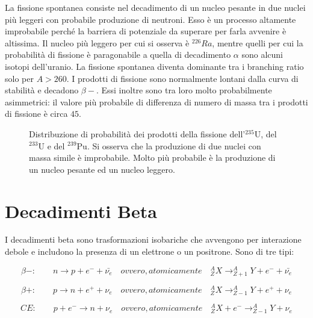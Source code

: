 La fissione spontanea consiste nel decadimento di un nucleo pesante in due nuclei più leggeri con probabile produzione di neutroni. Esso è un processo altamente improbabile perché la barriera di potenziale da superare per farla avvenire è altissima. Il nucleo più leggero per cui si osserva è $^{226}Ra$, mentre quelli per cui la probabilità di fissione è paragonabile a quella di decadimento $\alpha$ sono alcuni isotopi dell'uranio. La fissione spontanea diventa dominante tra i branching ratio solo per $A>260$.
I prodotti di fissione sono normalmente lontani dalla curva di stabilità e decadono $\beta-$. 
Essi inoltre sono tra loro molto probabilmente asimmetrici: il valore più probabile di differenza di numero di massa tra i prodotti di fissione è circa $45$.

\begin{figure} []
\centering
		\caption{Distribuzione di probabilità dei prodotti della fissione dell'$^{235}\text{U}$, del $^{233}\text{U}$ e del $^{239}\text{Pu}$. Si osserva che la produzione di due nuclei con massa simile è improbabile. Molto più probabile è la produzione di un nucleo pesante ed un nucleo leggero.}
         \label{fissionyealds}
\end{figure}

\section{Decadimenti Beta}

I decadimenti beta sono trasformazioni isobariche che avvengono per interazione debole e includono la presenza di un elettrone o un positrone. Sono di tre tipi:

\begin{equation}
\beta-: \qquad n \longrightarrow p + e^-+\bar{\nu_e}  \quad ovvero, atomicamente \quad  ^A_ZX \longrightarrow _{Z+1}^AY+e^-+\bar{\nu_e}
\end{equation}


\begin{equation}
\beta+: \qquad p \longrightarrow n + e^++\nu_e \quad ovvero, atomicamente \quad  ^A_ZX \longrightarrow _{Z-1}^AY+e^++\nu_e
\end{equation}


\begin{equation}
CE: \qquad p + e^- \longrightarrow n + \nu_e \quad ovvero, atomicamente \quad  ^A_ZX+e^- \longrightarrow _{Z-1}^AY+\nu_e
\end{equation}

